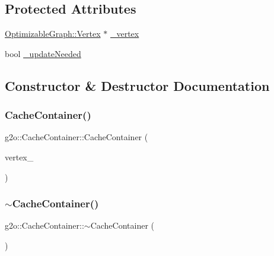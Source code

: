 \subsection*{Protected Attributes}
\begin{DoxyCompactItemize}
\item 
\mbox{\hyperlink{classg2o_1_1_optimizable_graph_1_1_vertex}{Optimizable\+Graph\+::\+Vertex}} $\ast$ \mbox{\hyperlink{classg2o_1_1_cache_container_a899b5f4d01859463cedf663b68f78391}{\+\_\+vertex}}
\item 
bool \mbox{\hyperlink{classg2o_1_1_cache_container_a5fd5257863e41c3fc38336aaa7779b3e}{\+\_\+update\+Needed}}
\end{DoxyCompactItemize}


\subsection{Constructor \& Destructor Documentation}
\mbox{\label{classg2o_1_1_cache_container_aed510932f7e499f2fd3c1fdea7809052}} 
\subsubsection{\texorpdfstring{Cache\+Container()}{CacheContainer()}}
{\footnotesize\ttfamily g2o\+::\+Cache\+Container\+::\+Cache\+Container (\begin{DoxyParamCaption}\item[{\mbox{\hyperlink{classg2o_1_1_optimizable_graph_1_1_vertex}{Optimizable\+Graph\+::\+Vertex}} $\ast$}]{vertex\+\_\+ }\end{DoxyParamCaption})}

\mbox{\label{classg2o_1_1_cache_container_a2eb9f659371a1af2c119fce3e2972e52}} 
\subsubsection{\texorpdfstring{$\sim$\+Cache\+Container()}{~CacheContainer()}}
{\footnotesize\ttfamily g2o\+::\+Cache\+Container\+::$\sim$\+Cache\+Container (\begin{DoxyParamCaption}{ }\end{DoxyParamCaption})\hspace{0.3cm}{\ttfamily [virtual]}}



